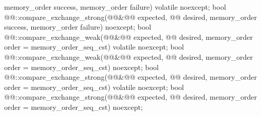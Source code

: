 \begin{itemdecl}
    memory_order success, memory_order failure) volatile noexcept;
bool @@::compare_exchange_strong(@@&@\itcorr[-1]@ expected, @@ desired,
    memory_order success, memory_order failure) noexcept;
bool @@::compare_exchange_weak(@@&@\itcorr[-1]@ expected, @@ desired,
    memory_order order = memory_order_seq_cst) volatile noexcept;
bool @@::compare_exchange_weak(@@&@\itcorr[-1]@ expected, @@ desired,
    memory_order order = memory_order_seq_cst) noexcept;
bool @@::compare_exchange_strong(@@&@\itcorr[-1]@ expected, @@ desired,
    memory_order order = memory_order_seq_cst) volatile noexcept;
bool @@::compare_exchange_strong(@@&@\itcorr[-1]@ expected, @@ desired,
    memory_order order = memory_order_seq_cst) noexcept;
\end{itemdecl}

